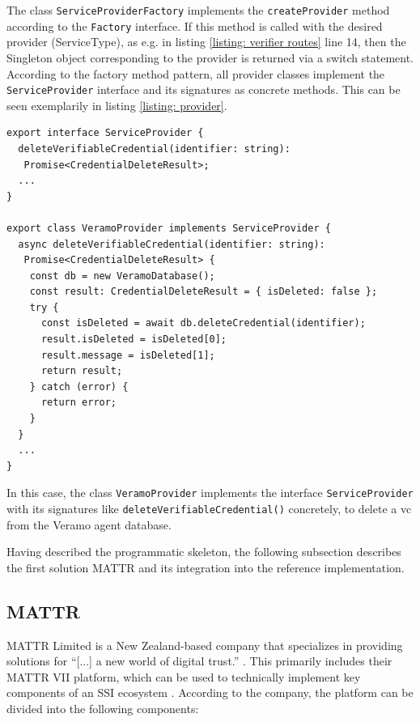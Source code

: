     The class \texttt{ServiceProviderFactory} implements the \texttt{createProvider} method according to the \texttt{Factory} interface. If this method is called with the desired provider (ServiceType), as e.g. in listing \ref{listing: verifier routes} line 14, then the Singleton object corresponding to the provider is returned via a switch statement. According to the factory method pattern, all provider classes implement the \texttt{ServiceProvider} interface and its signatures as concrete methods. This can be seen exemplarily in listing \ref{listing: provider}.

\begin{lstlisting}[style=ES6, caption=Example of provider implementation, label={listing: provider}]
export interface ServiceProvider {
  deleteVerifiableCredential(identifier: string): 
   Promise<CredentialDeleteResult>;
  ...
}

export class VeramoProvider implements ServiceProvider {
  async deleteVerifiableCredential(identifier: string): 
   Promise<CredentialDeleteResult> {
    const db = new VeramoDatabase();
    const result: CredentialDeleteResult = { isDeleted: false };
    try {
      const isDeleted = await db.deleteCredential(identifier);
      result.isDeleted = isDeleted[0];
      result.message = isDeleted[1];
      return result;
    } catch (error) {
      return error;
    }
  }
  ...
}\end{lstlisting}

    In this case, the class \texttt{VeramoProvider} implements the interface \texttt{ServiceProvider} with its signatures like \texttt{deleteVerifiableCredential()} concretely, to delete a \ac{vc} from the Veramo agent database.
    
    Having described the programmatic skeleton, the following subsection describes the first solution MATTR and its integration into the reference implementation.
    
    \subsection{MATTR}\label{subsection: mattr}
    MATTR Limited is a New Zealand-based company \cite{mattr_privacy_2021} that specializes in providing solutions for “[...] a new world of digital trust.” \cite{mattr_mattr_2021-4}. This primarily includes their MATTR VII platform, which can be used to technically implement key components of an \ac{SSI} ecosystem \cite{mattr_products_2021}. According to the company, the platform can be divided into the following components: \cite{mattr_mattr_2021-2}

